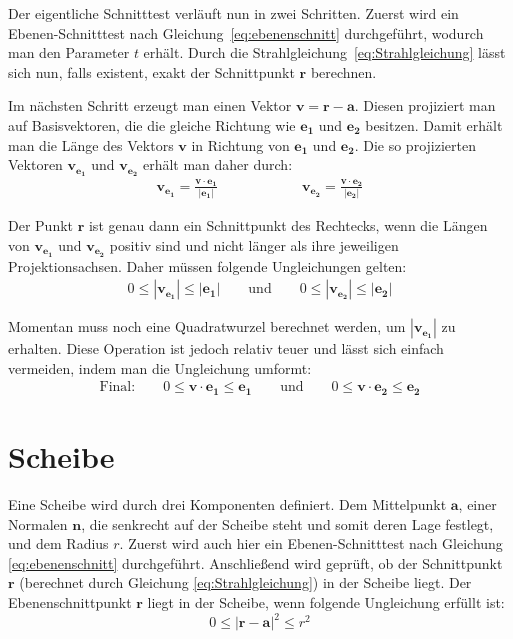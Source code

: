 Der eigentliche Schnitttest verläuft nun in zwei Schritten. Zuerst wird ein Ebenen-Schnitttest nach Gleichung~\ref{eq:ebenenschnitt} durchgeführt, wodurch man den Parameter \(t\) erhält. Durch die Strahlgleichung~\ref{eq:Strahlgleichung} lässt sich nun, falls existent, exakt der Schnittpunkt \(\boldsymbol{r}\) berechnen.

Im nächsten Schritt erzeugt man einen Vektor \(\boldsymbol{v}  = \boldsymbol{r} - \boldsymbol{a}\). Diesen projiziert man auf Basisvektoren, die die gleiche Richtung wie \( \boldsymbol{e_1} \) und \( \boldsymbol{e_2} \) besitzen.
Damit erhält man die Länge des Vektors \( \boldsymbol{v} \) in Richtung von \( \boldsymbol{e_1} \) und \( \boldsymbol{e_2} \). Die so projizierten Vektoren \( \boldsymbol{v_{e_1} } \) und \( \boldsymbol{v_{e_2} } \) erhält man daher durch:
\begin{align*}
    \boldsymbol{v_{e_1} } = \frac{ \boldsymbol{v} \cdot \boldsymbol{e_1} }{ |\boldsymbol{e_1}| }  \qquad \qquad \qquad
    \boldsymbol{v_{e_2} } = \frac{ \boldsymbol{v} \cdot \boldsymbol{e_2} }{ |\boldsymbol{e_2}| }
\end{align*}


Der Punkt \( \boldsymbol{r} \) ist genau dann ein Schnittpunkt des Rechtecks, wenn die Längen von \( \boldsymbol{v_{e_1} } \) und \( \boldsymbol{v_{e_2} } \) positiv sind und nicht länger als ihre jeweiligen Projektionsachsen. Daher müssen folgende Ungleichungen gelten:
\begin{align*}
    0 \leq |\boldsymbol{v_{e_1}}| \leq |\boldsymbol{e_1}| \qquad \text{und} \qquad
    0 \leq |\boldsymbol{v_{e_2}}| \leq |\boldsymbol{e_2}|
\end{align*}

Momentan muss noch eine Quadratwurzel berechnet werden, um \( |\boldsymbol{v_{e_1}}| \) zu erhalten. Diese Operation ist jedoch relativ teuer und lässt sich einfach vermeiden, indem man die Ungleichung umformt:
\begin{align}
  \text{Final:} \qquad  0 \leq \boldsymbol{v} \cdot \boldsymbol{e_1}  \leq \boldsymbol{e_1} \qquad \text{und} \qquad
    0 \leq \boldsymbol{v} \cdot \boldsymbol{e_2}  \leq \boldsymbol{e_2}
\end{align}

\FloatBarrier

\section{Scheibe}

Eine Scheibe wird durch drei Komponenten definiert. Dem Mittelpunkt \( \boldsymbol{a} \), einer Normalen \( \boldsymbol{n} \), die senkrecht auf der Scheibe steht und somit deren Lage festlegt, und dem Radius \( r \).
Zuerst wird auch hier ein Ebenen-Schnitttest nach Gleichung \ref{eq:ebenenschnitt} durchgeführt.
Anschließend wird geprüft, ob der Schnittpunkt \( \boldsymbol{r} \) (berechnet durch Gleichung \ref{eq:Strahlgleichung}) in der Scheibe liegt. Der Ebenenschnittpunkt \( \boldsymbol{r} \) liegt in der Scheibe, wenn folgende Ungleichung erfüllt ist:
\begin{equation}
    0 \leq |\boldsymbol{r} - \boldsymbol{a}|^2 \leq r^2
\end{equation}



